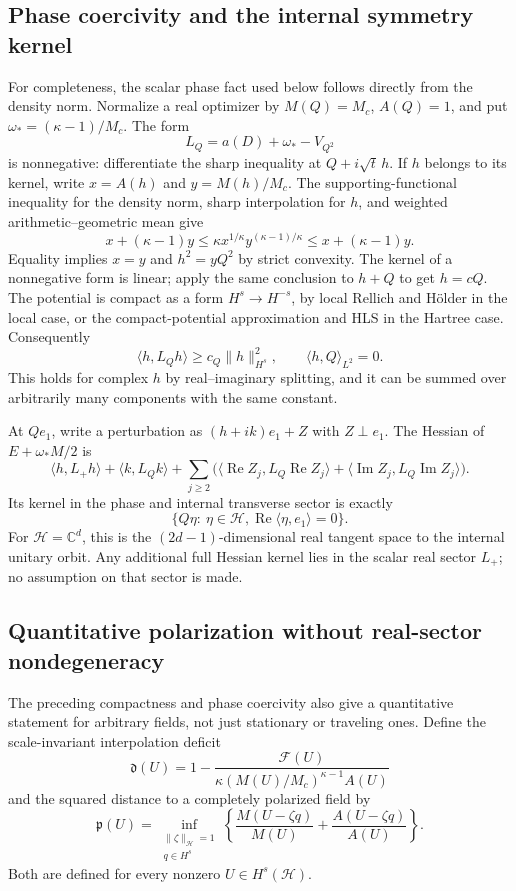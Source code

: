 \subsection{Phase coercivity and the internal symmetry kernel}
For completeness, the scalar phase fact used below follows directly
from the density norm. Normalize a real optimizer by $M(Q)=M_c$,
$A(Q)=1$, and put $\omega_*=(\kappa-1)/M_c$. The form
\[
 L_Q=a(D)+\omega_*-V_{Q^2}
\]
is nonnegative: differentiate the sharp inequality at
$Q+i\sqrt t\,h$. If $h$ belongs to its kernel, write
$x=A(h)$ and $y=M(h)/M_c$. The supporting-functional inequality
for the density norm, sharp interpolation for $h$, and weighted
arithmetic--geometric mean give
\[
 x+(\kappa-1)y
 \le\kappa x^{1/\kappa}y^{(\kappa-1)/\kappa}
 \le x+(\kappa-1)y.
\]
Equality implies $x=y$ and $h^2=yQ^2$ by strict convexity.
The kernel of a nonnegative form is linear; apply the same conclusion
to $h+Q$ to get $h=cQ$. The potential is compact as a form
$H^s\to H^{-s}$, by local Rellich and H\"older in the local case,
or the compact-potential approximation and HLS in the Hartree case.
Consequently
\begin{equation}\label{eq:r11-vectorcoercivity}
 \langle h,L_Qh\rangle\ge c_Q\|h\|_{H^s}^2,
 \qquad \langle h,Q\rangle_{L^2}=0.
\end{equation}
This holds for complex $h$ by real--imaginary splitting, and it can
be summed over arbitrarily many components with the same constant.

At $Qe_1$, write a perturbation as $(h+ik)e_1+Z$ with $Z\perp e_1$.
The Hessian of $E+\omega_*M/2$ is
\[
 \langle h,L_+h\rangle+\langle k,L_Qk\rangle
 +\sum_{j\ge2}\bigl(
  \langle\operatorname{Re}Z_j,L_Q\operatorname{Re}Z_j\rangle
 +\langle\operatorname{Im}Z_j,L_Q\operatorname{Im}Z_j\rangle\bigr).
\]
Its kernel in the phase and internal transverse sector is exactly
\[
 \{Q\eta:\ \eta\in\mathcal H,
                 \operatorname{Re}\langle\eta,e_1\rangle=0\}.
\]
For $\mathcal H=\mathbb C^d$, this is the $(2d-1)$-dimensional real
tangent space to the internal unitary orbit. Any additional full
Hessian kernel lies in the scalar real sector $L_+$; no assumption
on that sector is made.

\subsection{Quantitative polarization without real-sector nondegeneracy}
The preceding compactness and phase coercivity also give a quantitative
statement for arbitrary fields, not just stationary or traveling ones.
Define the scale-invariant interpolation deficit
\[
 \mathfrak d(U)=1-
 \frac{\mathcal F(U)}{\kappa(M(U)/M_c)^{\kappa-1}A(U)}
\]
and the squared distance to a completely polarized field by
\[
 \mathfrak p(U)=\inf_{\substack{\|\zeta\|_{\mathcal H}=1\\q\in H^s}}
 \left\{\frac{M(U-\zeta q)}{M(U)}
             +\frac{A(U-\zeta q)}{A(U)}\right\}.
\]
Both are defined for every nonzero $U\in H^s(\mathcal H)$.

